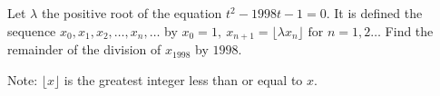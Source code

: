 Let $\lambda$ the positive root of the equation $t^2-1998t-1=0$.  It is defined the sequence $x_0,x_1,x_2,\ldots,x_n,\ldots$ by $x_0=1,\ x_{n+1}=\lfloor\lambda{x_n}\rfloor\mbox{ for }n=1,2\ldots$ Find the remainder of the division of $x_{1998}$ by $1998$.

Note: $\lfloor{x}\rfloor$ is the greatest integer less than or equal to $x$.